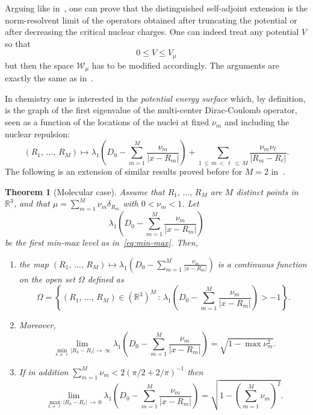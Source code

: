 \documentclass[10pt]{amsart}
\newtheorem{theo}[cdrthm]{Theorem}
\theoremstyle{definition}
\newcommand{\R}{\mathbb{R}}
\newcommand{\cW}{\mathcal{W}}
\newcommand\1{{\ensuremath {\mathds 1} }}
\newcommand{\ii}{\infty}
\renewcommand{\leq}{\leqslant}
\newcommand*{\romanenumi}{\renewcommand*{\theenumi}{\roman{enumi}}}
\begin{document}
Arguing like in~\cite{EstLewSer-19}, one can prove that the distinguished self-adjoint extension is the norm-resolvent limit of the operators obtained after truncating the potential or after decreasing the critical nuclear charges. One can indeed treat any potential $V$ so that
\[
0\leq V\leq V_\mu
\]
but then the space $\cW_\mu$ has to be modified accordingly. The arguments are exactly the same as in~\cite{EstLewSer-19}.


In chemistry one is interested in the \emph{potential energy surface} which, by definition, is the graph of the first eigenvalue of the multi-center Dirac-Coulomb operator, seen as a function of the locations of the nuclei at fixed $\nu_m$ and including the nuclear repulsion:
\[
(R_1,\,\dots,\,R_M)\mapsto \lambda_1\left(D_0-\sum_{m=1}^M\frac{\nu_m}{|x-R_m|}\right)+\sum_{1\,\leq\,m\,<\,\ell\,\leq\,M}\frac{\nu_m\nu_\ell}{|R_m-R_\ell|}.
\]
The following is an extension of similar results proved before for $M=2$ in~\cite{BriHog-03,HarKla-83,Klaus-80b}.


\begin{theo}[Molecular case]\label{Thm-continuity}
Assume that $R_1,\,\dots,\,R_M$ are $M$ distinct points in $\R^3$, and that $\mu=\sum_{m=1}^M\nu_m\delta_{R_m}$ with $0< \nu_m< 1$. Let
\[
\lambda_1\left(D_0-\sum_{m=1}^M\frac{\nu_m}{|x-R_m|}\right)
\]
be the first min-max level as in~\eqref{eq:min-max}. Then,
\begin{enumerate}\romanenumi
\item \label{theo3.5.1} the map $(R_1,\,\dots,\,R_M)\mapsto \lambda_1(D_0-\sum_{m=1}^M\frac{\nu_m}{|x-R_m|})$ is a continuous function on the open set $\Omega$ defined as
\[
\Omega=
\left\{(R_1,\,\dots,\,R_M)\in\left(\R^3\right)^M\, :\, \lambda_1\left(D_0-\sum_{m=1}^M\frac{\nu_m}{|x-R_m|}\right)>-1\right\}.
\]


\item \label{theo3.5.2}Moreover,
\begin{equation}
\lim_{\min_{k\,\neq\,\ell}\left|R_k-R_\ell\right|\to\,\ii}\lambda_1\left(D_0-\sum_{m=1}^M\frac{\nu_m}{|x-R_m|}\right)=\sqrt{1-\max\nu_m^2}.
\end{equation}


\item \label{theo3.5.3}If in addition $\sum_{m=1}^M\nu_m< 2(\pi/2+2/\pi)^{-1}$ then
\begin{equation}
\lim_{\max_{k\,\neq\,\ell}\left|R_k-R_\ell\right|\,\to\,0}\lambda_1\left(D_0-\sum_{m=1}^M\frac{\nu_m}{|x-R_m|}\right)=\sqrt{1-\left(\sum_{m=1}^M\nu_m\right)^2}.
\end{equation}
\end{enumerate}
\end{theo}
\end{document}
